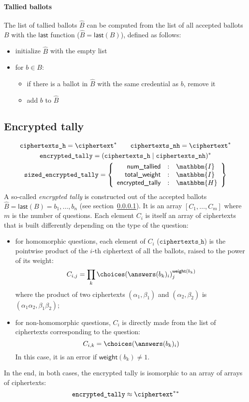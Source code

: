 \documentclass[a4paper]{article}
\newcommand{\hash}{\mathbbm{H}}
\newcommand{\I}{\mathbbm{I}}
\newcommand{\etally}{\texttt{encrypted\_tally}}
\begin{document}
\paragraph{Tallied ballots}
\label{tallied-ballots}
The list of tallied ballots $\hat B$ can be computed from the list of
all accepted ballots $B$ with the $\textsf{last}$ function
($\hat B=\textsf{last}(B)$), defined as follows:
\begin{itemize}
\item initialize $\hat B$ with the empty list
\item for $b\in B$:
  \begin{itemize}
  \item if there is a ballot in $\hat B$ with the same credential as
    $b$, remove it
  \item add $b$ to $\hat B$
  \end{itemize}
\end{itemize}

\subsection{Encrypted tally}
\label{tally}

\begin{gather*}
  \texttt{ciphertexts\_h}=\ciphertext^\ast
  \qquad
  \texttt{ciphertexts\_nh}=\ciphertext^\ast
  \\
  \etally=(\texttt{ciphertexts\_h}\mid\texttt{ciphertexts\_nh})^\ast\\
  \texttt{sized\_encrypted\_tally}=\left\{
    \begin{array}{rcl}
      \textsf{num\_tallied}&:&\I\\
      \textsf{total\_weight}&:&\I\\
      \textsf{encrypted\_tally}&:&\hash
    \end{array}
  \right\}
\end{gather*}
A so-called \emph{encrypted tally} is constructed out of the accepted
ballots $\hat B=\textsf{last}(B)=b_1,\dots,b_n$ (see section~\ref{tallied-ballots}).
It is an array $[C_1,\dots,C_m]$ where $m$ is the number of
questions. Each element $C_i$ is itself an array of ciphertexts that
is built differently depending on the type of the question:
\begin{itemize}
\item for homomorphic questions, each element of $C_i$
  ($\texttt{ciphertexts\_h}$) is the pointwise product of the $i$-th
  ciphertext of all the ballots, raised to the power of its weight:
  \[
    C_{i,j}=\prod_{k}\choices(\answers(b_k)_i)_j^{\textsf{weight}(b_k)}
  \]
  where the product of two ciphertexts $(\alpha_1,\beta_1)$ and
  $(\alpha_2,\beta_2)$ is $(\alpha_1\alpha_2,\beta_1\beta_2)$;
\item for non-homomorphic questions, $C_i$ is directly made from the
  list of ciphertexts corresponding to the question:
  \[
    C_{i,k}=\choices(\answers(b_k)_i)
  \]
  In this case, it is an error if $\textsf{weight}(b_k)\neq 1$.
\end{itemize}
In the end, in both cases, the encrypted tally is isomorphic to an
array of arrays of ciphertexts:
\[
\etally\approx\ciphertext^\ast{}^\ast
\]
\end{document}
